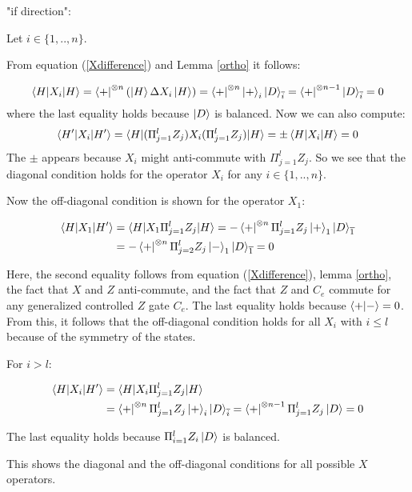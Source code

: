 \documentclass[12pt]{iopart}
\begin{document}
"if direction":

Let $i \in \{1,..,n\}$.

From equation (\ref{Xdifference}) and Lemma \ref{ortho} it follows:

\begin{equation}
\label{eq14}
\braket{H|X_i|H} = \bra{+}^{\otimes n} (\ket{H} \Delta X_i\ket{H}) = \bra{+}^{\otimes n}\ket{+}_i\ket{D}_{\overline{i}} = \bra{+}^{\otimes n-1}\ket{D}_{\overline{i}} = 0
\end{equation}
where the last equality holds because $\ket{D}$ is balanced.
Now we can also compute:
\begin{equation}
\braket{H^{\prime}|X_i|H^{\prime}} = \braket{H|(\Pi_{j=1}^l Z_j) X_i (\Pi_{j=1}^l Z_j)|H} = \pm \braket{H|X_i|H} = 0
\end{equation}
The $\pm$ appears because $X_i$ might anti-commute with $\Pi_{j=1}^l Z_j$.
So we see that the diagonal condition holds for the operator  $X_i$ for any $i \in \{1,..,n\}$.

Now the off-diagonal condition is shown for the operator $X_1$:

\begin{eqnarray}
\braket{H|X_1|H^\prime} &= \braket{H|X_1\Pi_{j=1}^l Z_j|H} = -\bra{+}^{\otimes n}\Pi_{j=1}^l Z_j\ket{+}_1\ket{D}_{\overline{1}} \nonumber \\
&= -\bra{+}^{\otimes n}\Pi_{j=2}^l Z_j\ket{-}_1\ket{D}_{\overline{1}} = 0
\end{eqnarray}

Here, the second equality follows from equation (\ref{Xdifference}), lemma \ref{ortho}, the fact that $X$ and $Z$ anti-commute, and the fact that $Z$ and $C_e$ commute for any generalized controlled $Z$ gate $C_e$.
The last equality holds because $\braket{+|-} = 0$.
From this, it follows that the off-diagonal condition holds for all $X_i$ with $i \leq l$ because of the symmetry of the states.

For $i>l$: 

\begin{eqnarray}
\braket{H|X_i|H^\prime} &= \braket{H|X_i\Pi_{j=1}^l Z_j|H} \nonumber \\ &= \bra{+}^{\otimes n} \Pi_{j=1}^l Z_j \ket{+}_i\ket{D}_{\overline{i}} = \bra{+}^{\otimes n-1}\Pi_{j=1}^l Z_j\ket{D} = 0
\end{eqnarray}

The last equality holds because $\Pi_{i=1}^l Z_i\ket{D}$ is balanced.

This shows the diagonal and the off-diagonal conditions for all possible $X$ operators.
\end{document}
